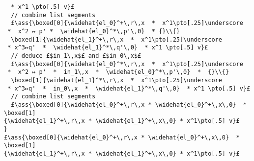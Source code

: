 \documentclass[12pt,a4paper]{article}
\makeatletter
\newcommand{\ml}[2][t]{\mbox{\mdseries\begin{tabular}[#1]{@{}L@{}}#2\end{tabular}}}
\newcommand{\ass}[1]{\ensuremath{{\color{blue}\left\{\ml[c]{#1}\right\}}}}
\makeatother
\begin{document}
\begin{lstlisting}
  * x^1 \pto[.5] v}£
  // combine list segments
  £\ass{\boxed[0]{\widehat{el_0}^+\,r\,x  *  x^1\pto[.25]\underscore  *  x^2 ↦ p' *  \widehat{el_0}^*\,p'\,0}  * {}\\{}
  \boxed[1]{\widehat{el_1}^+\,r\,x  *  x^1\pto[.25]\underscore  * x^3↦q'  *  \widehat{el_1}^*\,q'\,0}  * x^1 \pto[.5] v}£
  // deduce £$in_1\,x$£ and £$in_0\,x$£
  £\ass{\boxed[0]{\widehat{el_0}^*\,r\,x  *  x^1\pto[.25]\underscore  *  x^2 ↦ p'  *  in_1\,x  *  \widehat{el_0}^*\,p'\,0}  *  {}\\{}
  \boxed[1]{\widehat{el_1}^*\,r\,x  *  x^1\pto[.25]\underscore  * x^3↦q'  *  in_0\,x  *  \widehat{el_1}^*\,q'\,0}  * x^1 \pto[.5] v}£
  // combine list segments
  £\ass{\boxed[0]{\widehat{el_0}^+\,r\,x * \widehat{el_0}^+\,x\,0}  *  \boxed[1]{\widehat{el_1}^+\,r\,x * \widehat{el_1}^+\,x\,0} * x^1\pto[.5] v}£
}
£\ass{\boxed[0]{\widehat{el_0}^+\,r\,x * \widehat{el_0}^+\,x\,0}  *  \boxed[1]{\widehat{el_1}^+\,r\,x * \widehat{el_1}^+\,x\,0} * x^1\pto[.5] v}£
\end{lstlisting}
\end{document}
